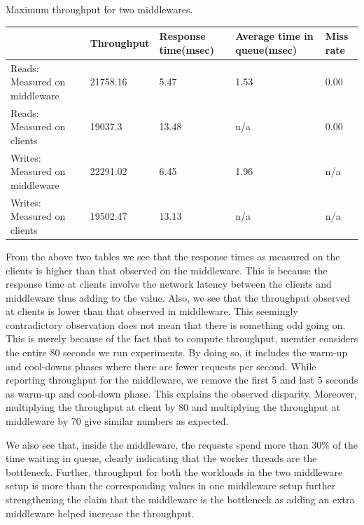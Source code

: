 \documentclass[11pt,a4paper]{article}
\newcommand\instructions[1]{\textcolor{blue}{Instructions: #1}}
\begin{document}
\begin{center}
	{Maximum throughput for two middlewares.}
	\begin{tabular}{|l|p{2cm}|p{2cm}|p{2cm}|p{2cm}|}
		\hline                                & Throughput & Response time(msec) & Average time in queue(msec) & Miss rate \\ 
		\hline Reads: Measured on middleware  & 21758.16   & 5.47          & 1.53                  & 0.00      \\ 
		\hline Reads: Measured on clients     & 19037.3    & 13.48         & n/a                   & 0.00      \\ 
		\hline Writes: Measured on middleware & 22291.02   & 6.45          & 1.96                  & n/a       \\ 
		\hline Writes: Measured on clients    & 19502.47   &   13.13       & n/a                   & n/a       \\ 
		\hline 
	\end{tabular}
\end{center}

From the above two tables we see that the response times as measured on the clients is higher than that observed on the middleware. This is because the response time at clients involve the network latency between the clients and middleware thus adding to the value. Also, we see that the throughput observed at clients is lower than that observed in middleware. This seemingly contradictory observation does not mean that there is something odd going on. This is merely because of the fact that to compute throughput, memtier considers the entire 80 seconds we run experiments. By doing so, it includes the warm-up and cool-downs phases where there are fewer requests per second. While reporting throughput for the middleware, we remove the first 5 and last 5 seconds as warm-up and cool-down phase. This explains the observed disparity. Moreover, multiplying the throughput at client by 80 and multiplying the throughput at middleware by 70 give similar numbers as expected.

We also see that, inside the middleware, the requests spend more than 30\% of the time waiting in queue, clearly indicating that the worker threads are the bottleneck. Further, throughput for both the workloads in the two middleware setup is more than the corresponding values in one middleware setup further strengthening the claim that the middleware is the bottleneck as adding an extra middleware helped increase the throughput.
\end{document}
